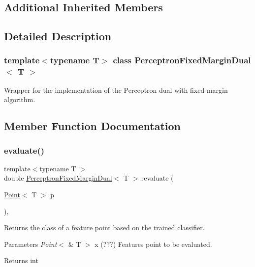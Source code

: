 \subsection*{Additional Inherited Members}


\subsection{Detailed Description}
\subsubsection*{template$<$typename T$>$\newline
class Perceptron\+Fixed\+Margin\+Dual$<$ T $>$}

Wrapper for the implementation of the Perceptron dual with fixed margin algorithm. 

\subsection{Member Function Documentation}
\mbox{\label{class_perceptron_fixed_margin_dual_acafabadf6d2552fde0bfb32f0344c6e3}} 
\subsubsection{\texorpdfstring{evaluate()}{evaluate()}}
{\footnotesize\ttfamily template$<$typename T $>$ \\
double \mbox{\hyperlink{class_perceptron_fixed_margin_dual}{Perceptron\+Fixed\+Margin\+Dual}}$<$ T $>$\+::evaluate (\begin{DoxyParamCaption}\item[{\mbox{\hyperlink{class_point}{Point}}$<$ T $>$}]{p }\end{DoxyParamCaption})\hspace{0.3cm}{\ttfamily [override]}, {\ttfamily [virtual]}}



Returns the class of a feature point based on the trained classifier. 


\begin{DoxyParams}{Parameters}
{\em Point$<$} & T $>$ x (???) Features point to be evaluated. \\
\hline
\end{DoxyParams}
\begin{DoxyReturn}{Returns}
int 
\end{DoxyReturn}


